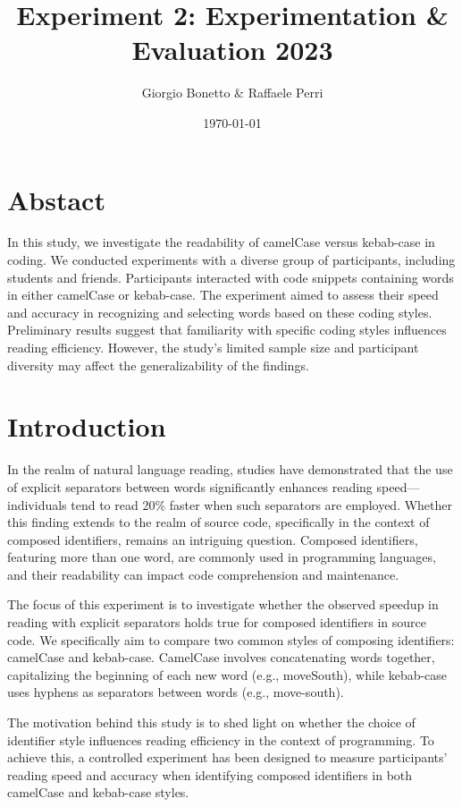 \documentclass{article}
\title{Experiment 2: Experimentation \& Evaluation 2023}
\author{Giorgio Bonetto \& Raffaele Perri}
\date{\today}
\begin{document}
\maketitle
\section*{Abstact}
In this study, we investigate the readability of camelCase versus kebab-case in coding. We conducted experiments with a diverse group of participants, including students and friends. Participants interacted with code snippets containing words in either camelCase or kebab-case. The experiment aimed to assess their speed and accuracy in recognizing and selecting words based on these coding styles. Preliminary results suggest that familiarity with specific coding styles influences reading efficiency. However, the study's limited sample size and participant diversity may affect the generalizability of the findings. 

\section{Introduction}
In the realm of natural language reading, studies have demonstrated that the use of explicit separators between words significantly enhances reading speed—individuals tend to read 20\% faster when such separators are employed. Whether this finding extends to the realm of source code, specifically in the context of composed identifiers, remains an intriguing question. Composed identifiers, featuring more than one word, are commonly used in programming languages, and their readability can impact code comprehension and maintenance.

The focus of this experiment is to investigate whether the observed speedup in reading with explicit separators holds true for composed identifiers in source code. We specifically aim to compare two common styles of composing identifiers: camelCase and kebab-case. CamelCase involves concatenating words together, capitalizing the beginning of each new word (e.g., moveSouth), while kebab-case uses hyphens as separators between words (e.g., move-south).

The motivation behind this study is to shed light on whether the choice of identifier style influences reading efficiency in the context of programming. To achieve this, a controlled experiment has been designed to measure participants' reading speed and accuracy when identifying composed identifiers in both camelCase and kebab-case styles.
\end{document}
